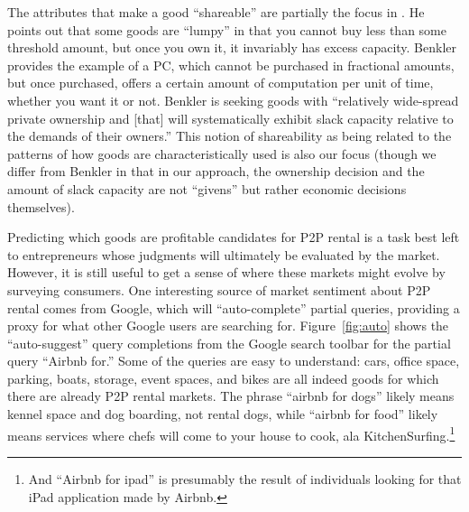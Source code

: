 \documentclass[11pt]{article}
\begin{document}
The attributes that make a good ``shareable'' are partially the focus in \cite{benkler2004sharing}.
He points out that some goods are ``lumpy'' in that you cannot buy less than some threshold amount, but once you own it, it invariably has excess capacity. 
Benkler provides the example of a PC, which cannot be purchased in fractional amounts, but once purchased, offers a certain amount of computation per unit of time, whether you want it or not. 
Benkler is seeking goods with ``relatively wide-spread private ownership and [that] will systematically exhibit slack capacity relative to the demands of their owners.''
This notion of shareability as being related to the patterns of how goods are characteristically used is also our focus (though we differ from Benkler in that in our approach, the ownership decision and the amount of slack capacity are not ``givens'' but rather economic decisions themselves). 

Predicting which goods are profitable candidates for P2P rental is a task best left to entrepreneurs whose judgments will ultimately be evaluated by the market. 
However, it is still useful to get a sense of where these markets might evolve by surveying consumers. 
One interesting source of market sentiment about P2P rental comes from Google, which will ``auto-complete'' partial queries, providing a proxy for what other Google users are searching for. 
Figure~\ref{fig:auto} shows the ``auto-suggest'' query completions from the Google search toolbar for the partial query ``Airbnb for.''
Some of the queries are easy to understand: 
cars, office space, parking, boats, storage, event spaces, and bikes are all indeed goods for which there are already P2P rental markets. 
The phrase ``airbnb for dogs'' likely means kennel space and dog boarding, not rental dogs, while ``airbnb for food'' likely means services where chefs will come to your house to cook, ala KitchenSurfing.\footnote{
  And ``Airbnb for ipad'' is presumably the result of individuals looking for that iPad application made by Airbnb.
}
\end{document}

